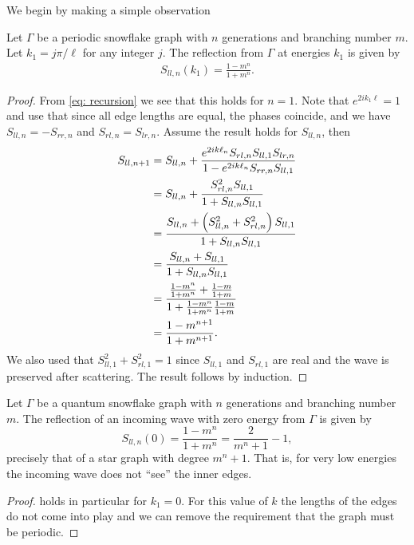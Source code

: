 
We begin by making a simple observation

\begin{lemma}\label{res: maximal periodic reflection}
  Let $\Gamma$ be a periodic snowflake graph with $n$ generations and branching number $m$. Let $k_1 = j\pi/\ell$ for any integer $j$. The reflection from $\Gamma$ at energies $k_1$ is given by
  \begin{align*}
    S_{ll,n}(k_1) = \frac{1-m^n}{1+m^n}.
  \end{align*}
\end{lemma}
\begin{proof}
  From \cref{eq: recursion} we see that this holds for $n=1$. Note that $e^{2ik_1\ell} = 1$ and use that since all edge lengths are equal, the phases coincide, and we have $S_{ll,n}=-S_{rr,n}$ and $S_{rl,n} = S_{lr,n}$. Assume the result holds for $S_{ll,n}$, then
  \begin{align*}
    S_{ll,n+1}
    &= S_{ll,n} + \frac{e^{2ik\ell_n} S_{rl,n} S_{ll,1} S_{lr,n}}{1 - e^{2ik\ell_n} S_{rr,n} S_{ll,1}} \\
    &= S_{ll,n} + \frac{S_{rl,n}^2 S_{ll,1}}{1 + S_{ll,n} S_{ll,1}} \\
    &= \frac{S_{ll,n} + \left(S_{ll,n}^2 + S_{rl,n}^2\right) S_{ll,1}}{1 + S_{ll,n} S_{ll,1}} \\
    &= \frac{S_{ll,n} + S_{ll,1}}{1 + S_{ll,n} S_{ll,1}} \\
    &= \frac{\frac{1-m^n}{1+m^n} + \frac{1-m}{1+m}}{1 + \frac{1-m^n}{1+m^n} \frac{1-m}{1+m}} \\
    &= \frac{1-m^{n+1}}{1+m^{n+1}}.
  \end{align*}
  We also used that $S_{ll,1}^2+S_{rl,1}^2 = 1$ since $S_{ll,1}$ and $S_{rl,1}$ are real and the wave is preserved after scattering.
  The result follows by induction.
\end{proof}

\begin{corollary}\label{res: R(0)}
  Let $\Gamma$ be a quantum snowflake graph with $n$ generations and branching number $m$. The reflection of an incoming wave with zero energy from $\Gamma$ is given by
  \[
    S_{ll,n}(0) = \frac{1-m^n}{1+m^n} = \frac{2}{m^n+1} - 1,
  \]
  precisely that of a star graph with degree $m^n+1$. That is, for very low energies the incoming wave does not ``see'' the inner edges.
\end{corollary}
\begin{proof}
   holds in particular for $k_1 = 0$. For this value of $k$ the lengths of the edges do not come into play and we can remove the requirement that the graph must be periodic.
\end{proof}


